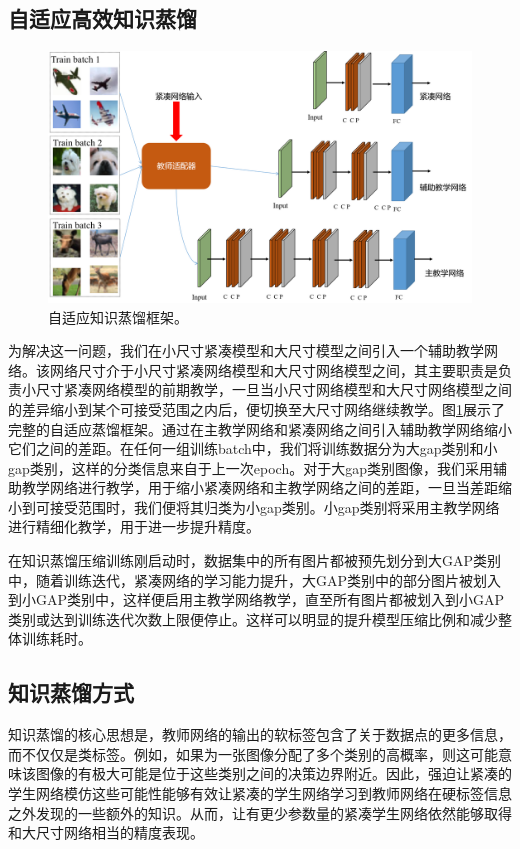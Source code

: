 \subsection{自适应高效知识蒸馏}
\begin{figure}[h]
	\centering
	\includegraphics[width=1\textwidth]{figures/adaptive_frame.png}
	\caption{自适应知识蒸馏框架。}
	\label{frame}
\end{figure}
为解决这一问题，我们在小尺寸紧凑模型和大尺寸模型之间引入一个辅助教学网络。该网络尺寸介于小尺寸紧凑网络模型和大尺寸网络模型之间，其主要职责是负责小尺寸紧凑网络模型的前期教学，一旦当小尺寸网络模型和大尺寸网络模型之间的差异缩小到某个可接受范围之内后，便切换至大尺寸网络继续教学。图\ref{frame}展示了完整的自适应蒸馏框架。通过在主教学网络和紧凑网络之间引入辅助教学网络缩小它们之间的差距。在任何一组训练batch中，我们将训练数据分为大gap类别和小gap类别，这样的分类信息来自于上一次epoch。对于大gap类别图像，我们采用辅助教学网络进行教学，用于缩小紧凑网络和主教学网络之间的差距，一旦当差距缩小到可接受范围时，我们便将其归类为小gap类别。小gap类别将采用主教学网络进行精细化教学，用于进一步提升精度。

在知识蒸馏压缩训练刚启动时，数据集中的所有图片都被预先划分到大GAP类别中，随着训练迭代，紧凑网络的学习能力提升，大GAP类别中的部分图片被划入到小GAP类别中，这样便启用主教学网络教学，直至所有图片都被划入到小GAP类别或达到训练迭代次数上限便停止。这样可以明显的提升模型压缩比例和减少整体训练耗时。


\subsection{知识蒸馏方式}
知识蒸馏的核心思想是，教师网络的输出的软标签包含了关于数据点的更多信息，而不仅仅是类标签。例如，如果为一张图像分配了多个类别的高概率，则这可能意味该图像的有极大可能是位于这些类别之间的决策边界附近。因此，强迫让紧凑的学生网络模仿这些可能性能够有效让紧凑的学生网络学习到教师网络在硬标签信息之外发现的一些额外的知识。从而，让有更少参数量的紧凑学生网络依然能够取得和大尺寸网络相当的精度表现。

